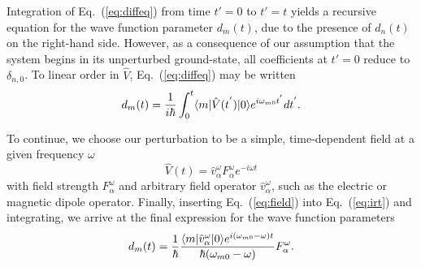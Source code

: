 {{Integration of Eq.~(\ref{eq:diffeq}) from time $t' = 0$ to $t' = t$ yields a recursive equation for the 
wave function parameter $d_m(t)$, due to the presence of $d_n(t)$ on the right-hand side. 
However, as a consequence of our assumption that the system begins in its unperturbed ground-state, all
coefficients at $t' = 0$ reduce to $\delta_{n,0}$. To linear order in $\hat{V}$, Eq.~(\ref{eq:diffeq}) may be written
\begin{equation} \label{eq:irt}
    d_m(t) = \frac{1}{i\hbar}\int_0^t\langle m |\hat{V}(t^{'})| 0 \rangle e^{i\omega_{m0}t^{'}}dt^{'}.
\end{equation}

To continue, we choose our perturbation to be a simple, time-dependent field at a given frequency $\omega$ 
\begin{equation} \label{eq:field}
\hat{V}(t) = \hat{v}^\omega_\alpha F^\omega_\alpha e^{-i\omega t}
\end{equation}
with field strength $F^\omega_\alpha$ and arbitrary field operator $\hat{v}^\omega_\alpha$, such as the electric or magnetic dipole operator. 
Finally, inserting Eq.~(\ref{eq:field}) into Eq.~(\ref{eq:irt}) and integrating, we arrive at the final expression for the
wave function parameters
\begin{equation} \label{eq:sot}
    \begin{aligned}
        d_m(t) = \frac{1}{\hbar}\frac{\langle m |\hat{v}^\omega_\alpha| 0 \rangle e^{i(\omega_{m0}-\omega)t}}{\hbar(\omega_{m0}-\omega)}F^{\omega}_{\alpha}.
    \end{aligned}
\end{equation}
 
}}
